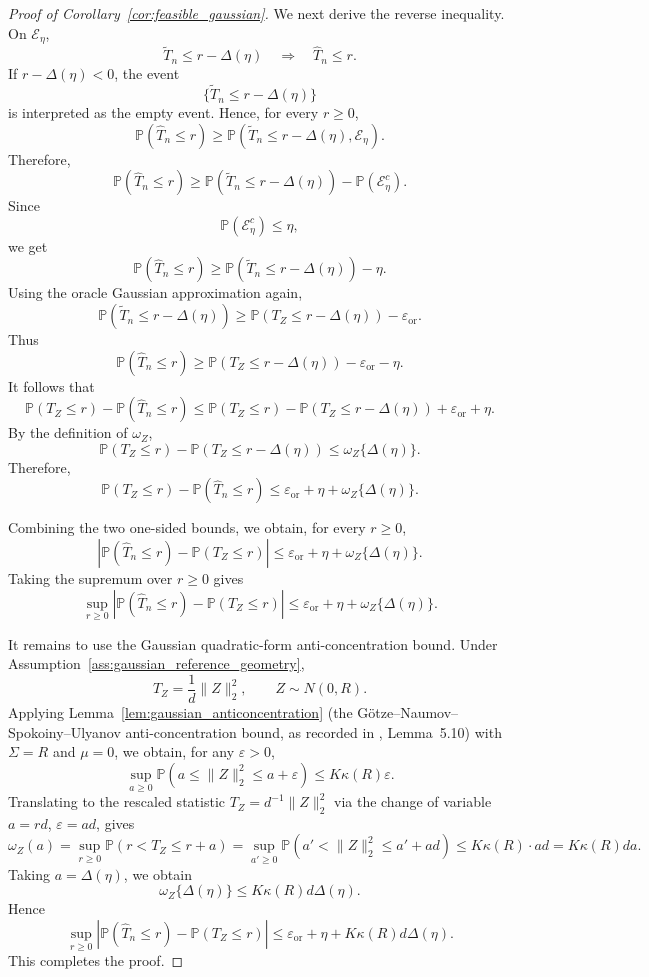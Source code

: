 \documentclass[
  12pt]{article}
\theoremstyle{plain}
\theoremstyle{definition}
\theoremstyle{remark}
\begin{document}
\begin{proof}[Proof of Corollary~\ref{cor:feasible_gaussian}]
We next derive the reverse inequality. On \(\mathcal E_\eta\),
\[
\widetilde T_n\le r-\Delta(\eta)
\quad\Longrightarrow\quad
\widehat T_n\le r.
\]
If \(r-\Delta(\eta)<0\), the event
\[
\{\widetilde T_n\le r-\Delta(\eta)\}
\]
is interpreted as the empty event. Hence, for every \(r\ge0\),
\[
\mathbb P(\widehat T_n\le r)
\ge
\mathbb P(\widetilde T_n\le r-\Delta(\eta),\mathcal E_\eta).
\]
Therefore,
\[
\mathbb P(\widehat T_n\le r)
\ge
\mathbb P(\widetilde T_n\le r-\Delta(\eta))
-
\mathbb P(\mathcal E_\eta^c).
\]
Since
\[
\mathbb P(\mathcal E_\eta^c)\le \eta,
\]
we get
\[
\mathbb P(\widehat T_n\le r)
\ge
\mathbb P(\widetilde T_n\le r-\Delta(\eta))
-
\eta.
\]
Using the oracle Gaussian approximation again,
\[
\mathbb P(\widetilde T_n\le r-\Delta(\eta))
\ge
\mathbb P(T_Z\le r-\Delta(\eta))
-
\varepsilon_{\mathrm{or}}.
\]
Thus
\[
\mathbb P(\widehat T_n\le r)
\ge
\mathbb P(T_Z\le r-\Delta(\eta))
-
\varepsilon_{\mathrm{or}}
-
\eta.
\]
It follows that
\[
\mathbb P(T_Z\le r)-\mathbb P(\widehat T_n\le r)
\le
\mathbb P(T_Z\le r)
-
\mathbb P(T_Z\le r-\Delta(\eta))
+
\varepsilon_{\mathrm{or}}
+
\eta.
\]
By the definition of \(\omega_Z\),
\[
\mathbb P(T_Z\le r)
-
\mathbb P(T_Z\le r-\Delta(\eta))
\le
\omega_Z\{\Delta(\eta)\}.
\]
Therefore,
\[
\mathbb P(T_Z\le r)-\mathbb P(\widehat T_n\le r)
\le
\varepsilon_{\mathrm{or}}
+
\eta
+
\omega_Z\{\Delta(\eta)\}.
\]

Combining the two one-sided bounds, we obtain, for every \(r\ge0\),
\[
\left|
\mathbb P(\widehat T_n\le r)
-
\mathbb P(T_Z\le r)
\right|
\le
\varepsilon_{\mathrm{or}}
+
\eta
+
\omega_Z\{\Delta(\eta)\}.
\]
Taking the supremum over \(r\ge0\) gives
\[
\sup_{r\ge0}
\left|
\mathbb P(\widehat T_n\le r)
-
\mathbb P(T_Z\le r)
\right|
\le
\varepsilon_{\mathrm{or}}
+
\eta
+
\omega_Z\{\Delta(\eta)\}.
\]

It remains to use the Gaussian quadratic-form anti-concentration bound. Under
Assumption~\ref{ass:gaussian_reference_geometry},
\[
T_Z
=
\frac1d\|Z\|_2^2,
\qquad
Z\sim N(0,R).
\]
Applying Lemma~\ref{lem:gaussian_anticoncentration} (the
Götze--Naumov--Spokoiny--Ulyanov anti-concentration bound, as recorded in
\citealp{fang_large-dimensional_2021}, Lemma~5.10) with \(\Sigma=R\) and
\(\mu=0\), we obtain, for any \(\varepsilon>0\),
\[
\sup_{a\ge 0}\mathbb P(a\le \|Z\|_2^2\le a+\varepsilon)\le K\kappa(R)\varepsilon.
\]
Translating to the rescaled statistic \(T_Z=d^{-1}\|Z\|_2^2\) via the change of
variable \(a=rd\), \(\varepsilon=ad\), gives
\[
\omega_Z(a)
=
\sup_{r\ge0}\mathbb P(r<T_Z\le r+a)
=
\sup_{a'\ge0}\mathbb P(a'<\|Z\|_2^2\le a'+ad)
\le
K\kappa(R)\cdot ad
=
K\kappa(R)d a.
\]
Taking \(a=\Delta(\eta)\), we obtain
\[
\omega_Z\{\Delta(\eta)\}
\le
K\kappa(R)d\Delta(\eta).
\]
Hence
\[
\sup_{r\ge0}
\left|
\mathbb P(\widehat T_n\le r)
-
\mathbb P(T_Z\le r)
\right|
\le
\varepsilon_{\mathrm{or}}
+
\eta
+
K\kappa(R)d\Delta(\eta).
\]
This completes the proof.
\end{proof}
\end{document}
